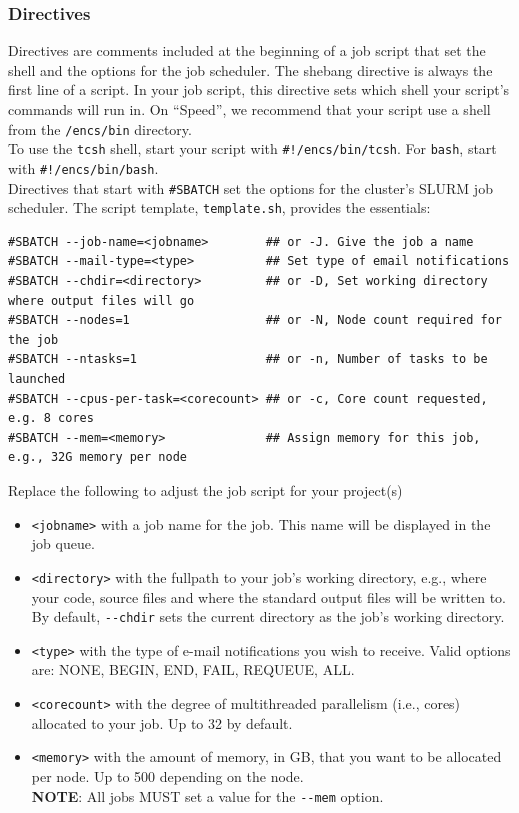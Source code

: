 \subsubsection{Directives}
\label{sect:directives}

Directives are comments included at the beginning of a job script that set the shell 
and the options for the job scheduler. 
%
The shebang directive is always the first line of a script. In your job script, 
this directive sets which shell your script's commands will run in. On ``Speed'', 
we recommend that your script use a shell from the \texttt{/encs/bin} directory.\\
%
To use the \texttt{tcsh} shell, start your script with \verb|#!/encs/bin/tcsh|.
For \texttt{bash}, start with \verb|#!/encs/bin/bash|.\\

Directives that start with \verb|#SBATCH| set the options for the cluster's 
SLURM job scheduler. The script template, \texttt{template.sh}, 
provides the essentials:

\begin{verbatim}
#SBATCH --job-name=<jobname>        ## or -J. Give the job a name 
#SBATCH --mail-type=<type>          ## Set type of email notifications
#SBATCH --chdir=<directory>         ## or -D, Set working directory where output files will go 
#SBATCH --nodes=1                   ## or -N, Node count required for the job
#SBATCH --ntasks=1                  ## or -n, Number of tasks to be launched
#SBATCH --cpus-per-task=<corecount> ## or -c, Core count requested, e.g. 8 cores
#SBATCH --mem=<memory>              ## Assign memory for this job, e.g., 32G memory per node 
\end{verbatim}

\noindent Replace the following to adjust the job script for your project(s)
\begin{itemize}
  \item \verb+<jobname>+ with a job name for the job. This name will be displayed in the job queue.
  \item \verb+<directory>+ with the fullpath to your job's working directory, e.g., where your code, source files 
  and where the standard output files will be written to. By default, \verb+--chdir+ sets the current directory as the job's working directory.
  \item \verb+<type>+ with the type of e-mail notifications you wish to receive. Valid options are: NONE, BEGIN, END, FAIL, REQUEUE, ALL.
  \item \verb+<corecount>+ with the degree of multithreaded parallelism (i.e., cores) allocated to your job. Up to 32 by default.
  \item \verb+<memory>+ with the amount of memory, in GB, that you want to be allocated per node. Up to 500 depending on the node.\\
  \textbf{NOTE}: All jobs MUST set a value for the \verb|--mem| option.
\end{itemize}

